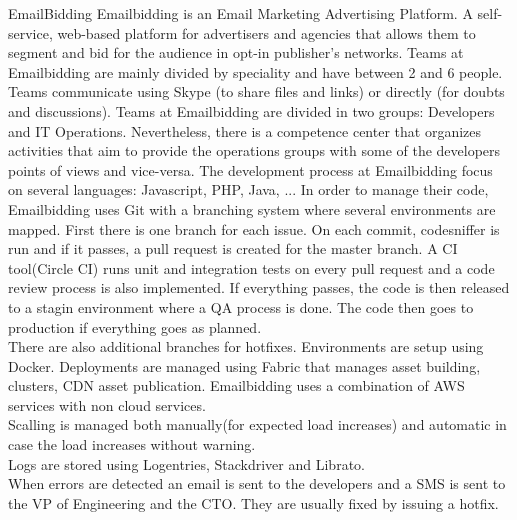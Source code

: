     \begin{companyreport}{EmailBidding}
      \product
      Emailbidding is an Email Marketing Advertising Platform.  A self-service, web-based platform for advertisers and agencies that allows them to segment and bid for the audience in opt-in publisher’s networks.
      \teams
      Teams at Emailbidding are mainly divided by speciality and have between 2 and 6 people. Teams communicate using Skype (to share files and links) or directly (for doubts and discussions).
      Teams at Emailbidding are divided in two groups: Developers and IT Operations. Nevertheless, there is a competence center that organizes activities that aim to provide the operations groups with some of the developers points of views and vice-versa.
      \development
      The development process at Emailbidding focus on several languages: Javascript, PHP, Java, ... In order to manage their code, Emailbidding uses Git with a branching system where several environments are mapped. First there is one branch for each issue. On each commit, codesniffer is run and if it passes, a pull request is created for the master branch. A CI tool(Circle CI) runs unit and integration tests on every pull request and a code review process is also implemented. If everything passes, the code is then released to a stagin environment where a QA process is done. The code then goes to production if everything goes as planned. \\
      There are also additional branches for hotfixes.
      Environments are setup using Docker.
      \operations
      Deployments are managed using Fabric that manages asset building, clusters, CDN asset publication. Emailbidding uses a combination of AWS services with non cloud services. \\
      Scalling is managed both manually(for expected load increases) and automatic in case the load increases without warning. \\
      Logs are stored using Logentries, Stackdriver and Librato. \\
      When errors are detected an email is sent to the developers and a SMS is sent to the VP of Engineering and the CTO. They are usually fixed by issuing a hotfix.
      \reportend
    \end{companyreport}

